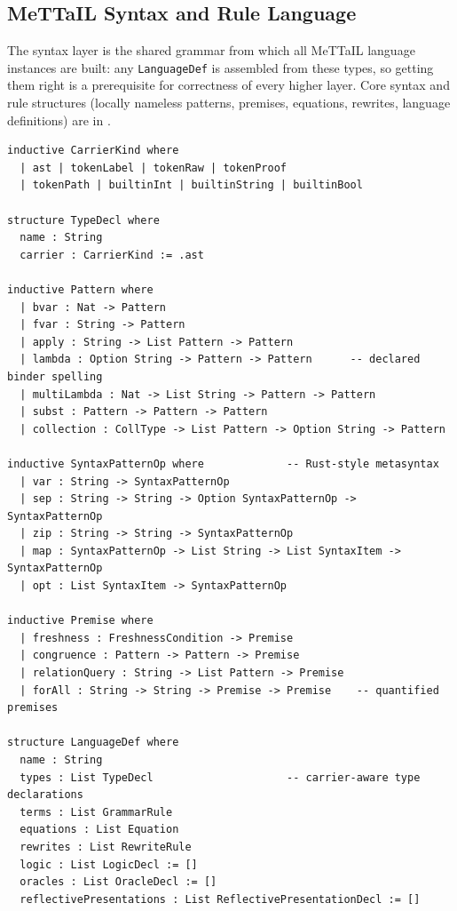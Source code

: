 \documentclass[11pt]{article}
\newcommand{\code}[1]{\texttt{#1}}
\newcommand{\codepath}[1]{\path{#1}}
\begin{document}
\subsection{MeTTaIL Syntax and Rule Language}

The syntax layer is the shared grammar from which all MeTTaIL language instances
are built: any \code{LanguageDef} is assembled from these types, so getting them
right is a prerequisite for correctness of every higher layer.
Core syntax and rule structures (locally nameless patterns, premises, equations,
rewrites, language definitions) are in
\codepath{Mettapedia/OSLF/MeTTaIL/Syntax.lean}.

\begin{lstlisting}[language={},caption={Core MeTTaIL structures (excerpt)}]
inductive CarrierKind where
  | ast | tokenLabel | tokenRaw | tokenProof
  | tokenPath | builtinInt | builtinString | builtinBool

structure TypeDecl where
  name : String
  carrier : CarrierKind := .ast

inductive Pattern where
  | bvar : Nat -> Pattern
  | fvar : String -> Pattern
  | apply : String -> List Pattern -> Pattern
  | lambda : Option String -> Pattern -> Pattern      -- declared binder spelling
  | multiLambda : Nat -> List String -> Pattern -> Pattern
  | subst : Pattern -> Pattern -> Pattern
  | collection : CollType -> List Pattern -> Option String -> Pattern

inductive SyntaxPatternOp where             -- Rust-style metasyntax
  | var : String -> SyntaxPatternOp
  | sep : String -> String -> Option SyntaxPatternOp -> SyntaxPatternOp
  | zip : String -> String -> SyntaxPatternOp
  | map : SyntaxPatternOp -> List String -> List SyntaxItem -> SyntaxPatternOp
  | opt : List SyntaxItem -> SyntaxPatternOp

inductive Premise where
  | freshness : FreshnessCondition -> Premise
  | congruence : Pattern -> Pattern -> Premise
  | relationQuery : String -> List Pattern -> Premise
  | forAll : String -> String -> Premise -> Premise    -- quantified premises

structure LanguageDef where
  name : String
  types : List TypeDecl                     -- carrier-aware type declarations
  terms : List GrammarRule
  equations : List Equation
  rewrites : List RewriteRule
  logic : List LogicDecl := []
  oracles : List OracleDecl := []
  reflectivePresentations : List ReflectivePresentationDecl := []
\end{lstlisting}
\end{document}
